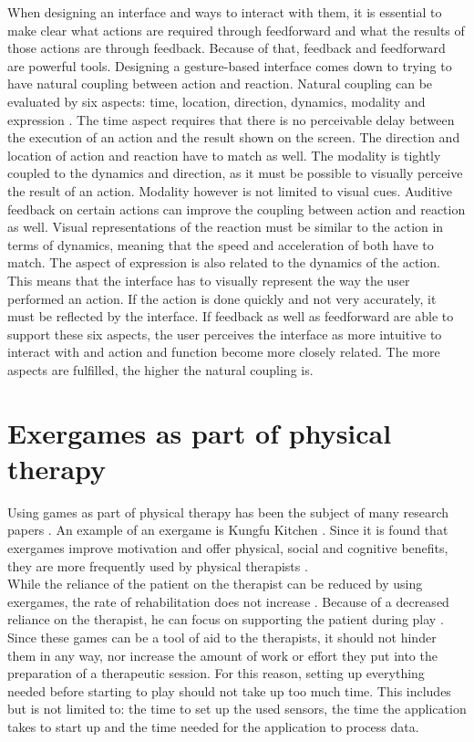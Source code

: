 When designing an interface and ways to interact with them, it is essential to make clear what actions are required through feedforward and what the results of those actions are through feedback. Because of that, feedback and feedforward are powerful tools. Designing a gesture-based interface comes down to trying to have natural coupling between action and reaction. Natural coupling can be evaluated by six aspects: time, location, direction, dynamics, modality and expression \cite{Wensveen2004}. The time aspect requires that there is no perceivable delay between the execution of an action and the result shown on the screen. The direction and location of action and reaction have to match as well. The modality is tightly coupled to the dynamics and direction, as it must be possible to visually perceive the result of an action. Modality however is not limited to visual cues. Auditive feedback on certain actions can improve the coupling between action and reaction as well. Visual representations of the reaction must be similar to the action in terms of dynamics, meaning that the speed and acceleration of both have to match. The aspect of expression is also related to the dynamics of the action. This means that the interface has to visually represent the way the user performed an action. If the action is done quickly and not very accurately, it must be reflected by the interface. If feedback as well as feedforward are able to support these six aspects, the user perceives the interface as more intuitive to interact with and action and function become more closely related. The more aspects are fulfilled, the higher the natural coupling is. \cite{Wensveen2004}\\


\section{Exergames as part of physical therapy}

Using games as part of physical therapy has been the subject of many research papers \cite{Geurts2011}\cite{Hondori2014}\cite{Lange2012}\cite{Chang2011}. An example of an exergame is Kungfu Kitchen \cite{KungFuKitchen}. Since it is found that exergames improve motivation \cite{Brauner2013} and offer physical, social and cognitive benefits, they are more frequently used by physical therapists \cite{Peng2011}\cite{Staiano2011}.\\

While the reliance of the patient on the therapist can be reduced by using exergames, the rate of rehabilitation does not increase \cite{Dahl2014}. Because of a decreased reliance on the therapist, he can focus on supporting the patient during play \cite{Annema2013}. Since these games can be a tool of aid to the therapists, it should not hinder them in any way, nor increase the amount of work or effort they put into the preparation of a therapeutic session. For this reason, setting up everything needed before starting to play should not take up too much time. This includes but is not limited to: the time to set up the used sensors, the time the application takes to start up and the time needed for the application to process data.\\

